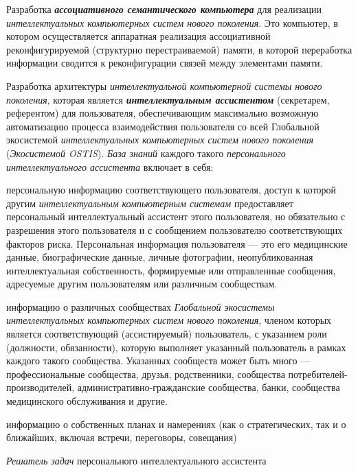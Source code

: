 \begin{textitemize}
	Разработка \textbf{\textit{ассоциативного семантического компьютера}} для реализации \textit{интеллектуальных компьютерных систем нового поколения}. Это  компьютер, в котором осуществляется аппаратная реализация ассоциативной реконфигурируемой (структурно перестраиваемой) памяти, в которой переработка информации сводится к реконфигурации связей между элементами памяти.
	\medskip
	\item Разработка архитектуры \textit{интеллектуальной компьютерной системы нового поколения}, которая является \textbf{\textit{ интеллектуальным ассистентом}} (секретарем, референтом) для  пользователя, обеспечивающим максимально возможную автоматизацию процесса взаимодействия пользователя со всей Глобальной экосистемой \textit{интеллектуальных компьютерных систем нового поколения} (\textit{Экосистемой OSTIS}). \textit{База знаний} каждого такого \textit{персонального интеллектуального ассистента} включает в себя:
	\begin{textitemize}
		\item персональную информацию соответствующего пользователя, доступ к которой другим \textit{интеллектуальным компьютерным системам} предоставляет персональный интеллектуальный ассистент этого пользователя, но обязательно с разрешения этого пользователя и с сообщением пользователю соответствующих факторов риска. Персональная информация пользователя --- это его медицинские данные, биографические данные, личные фотографии, неопубликованная интеллектуальная собственность, формируемые или отправленные сообщения, адресуемые другим пользователям или различным сообществам.
		\item информацию о различных сообществах \textit{Глобальной экосистемы интеллектуальных компьютерных систем нового поколения}, членом которых является соответствующий (ассистируемый) пользователь, с указанием роли (должности, обязанности), которую выполняет указанный пользователь в рамках каждого такого сообщества. Указанных сообществ может быть много --- профессиональные сообщества, друзья, родственники, сообщества потребителей-производителей, административно-гражданские сообщества, банки, сообщества медицинского обслуживания и другие.
		\item информацию о собственных планах и намерениях (как о стратегических, так и о ближайших, включая встречи, переговоры, совещания)
	\end{textitemize}
	\textit{Решатель задач} персонального интеллектуального ассистента
	\begin{textitemize}

\end{textitemize}
\end{textitemize}
